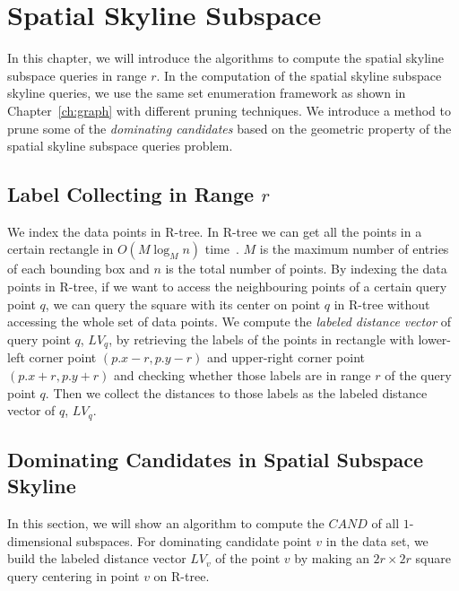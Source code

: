 
%
%

\chapter{Spatial Skyline Subspace}
\label{ch:spatial}

In this chapter, we will introduce the algorithms to compute the spatial skyline subspace queries in range $r$. In the computation of the spatial skyline subspace skyline queries, we use the same set enumeration framework as shown in Chapter~\ref{ch:graph} with different pruning techniques. We introduce a method to prune some of the \emph{dominating candidates} based on the geometric property of the spatial skyline subspace queries problem.

\section{Label Collecting in Range $r$}
We index the data points in R-tree. In R-tree we can get all the points in a certain rectangle in $O(M \log_M n)$ time~\cite{guttman1984r}. $M$ is the maximum number of entries of each bounding box and $n$ is the total number of points. By indexing the data points in R-tree, if we want to access the neighbouring points of a certain query point $q$, we can query the square with its center on point $q$ in R-tree without accessing the whole set of data points. We compute the \emph{labeled distance vector} of query point $q$, $LV_q$, by retrieving the labels of the points in rectangle with lower-left corner point $(p.x - r, p.y - r)$ and upper-right corner point $(p.x + r, p.y + r)$ and checking whether those labels are in range $r$ of the query point $q$. Then we collect the distances to those labels as the labeled distance vector of $q$, $LV_q$.

\section{Dominating Candidates in Spatial Subspace Skyline}

In this section, we will show an algorithm to compute the $\mathit{CAND}$ of all $1$-dimensional subspaces. For dominating candidate point $v$ in the data set, we build the labeled distance vector $LV_v$ of the point $v$ by making an $2r \times 2r$ square query centering in point $v$ on R-tree.

